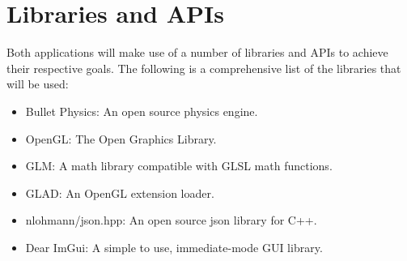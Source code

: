 


\section{Libraries and APIs}

Both applications will make use of a number of libraries and APIs to achieve their respective goals. 
The following is a comprehensive list of the libraries that will be used:

\begin{itemize}
  \item Bullet Physics: An open source physics engine.
  \item OpenGL: The Open Graphics Library.
  \item GLM: A math library compatible with GLSL math functions.
  \item GLAD: An OpenGL extension loader.
  \item nlohmann/json.hpp: An open source json library for C++.
  \item Dear ImGui: A simple to use, immediate-mode GUI library.
\end{itemize}

